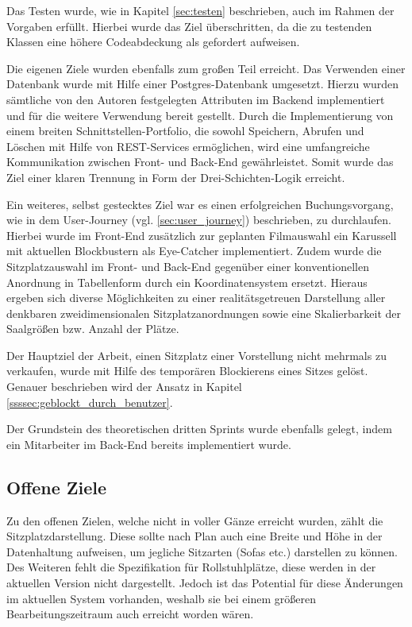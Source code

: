Das Testen wurde, wie in Kapitel \vref{sec:testen} beschrieben, auch im Rahmen der Vorgaben erfüllt. Hierbei wurde das Ziel überschritten, da die zu testenden Klassen eine höhere Codeabdeckung als gefordert aufweisen.

Die eigenen Ziele wurden ebenfalls zum großen Teil erreicht. Das Verwenden einer Datenbank wurde mit Hilfe einer Postgres-Datenbank umgesetzt.
Hierzu wurden sämtliche von den Autoren festgelegten Attributen im Backend implementiert und für die weitere Verwendung bereit gestellt.
Durch die Implementierung von einem breiten Schnittstellen-Portfolio, die sowohl Speichern, Abrufen und Löschen mit Hilfe von \acs{REST}-Services ermöglichen, wird eine umfangreiche Kommunikation zwischen Front- und Back-End gewährleistet.
Somit wurde das Ziel einer klaren Trennung in Form der Drei-Schichten-Logik erreicht.

Ein weiteres, selbst gestecktes Ziel war es einen erfolgreichen Buchungsvorgang, wie in dem User-Journey (vgl. \vref{sec:user_journey}) beschrieben, zu durchlaufen.
Hierbei wurde im Front-End zusätzlich zur geplanten Filmauswahl ein Karussell mit aktuellen Blockbustern als Eye-Catcher implementiert.
Zudem wurde die Sitzplatzauswahl im Front- und Back-End gegenüber einer konventionellen Anordnung in Tabellenform durch ein Koordinatensystem ersetzt.
Hieraus ergeben sich diverse Möglichkeiten zu einer realitätsgetreuen Darstellung aller denkbaren zweidimensionalen Sitzplatzanordnungen sowie eine Skalierbarkeit der Saalgrößen bzw. Anzahl der Plätze.

Der Hauptziel der Arbeit, einen Sitzplatz einer Vorstellung nicht mehrmals zu verkaufen, wurde mit Hilfe des temporären Blockierens eines Sitzes gelöst. 
Genauer beschrieben wird der Ansatz in Kapitel \vref{ssssec:geblockt_durch_benutzer}.

Der Grundstein des theoretischen dritten Sprints wurde ebenfalls gelegt, indem ein Mitarbeiter im Back-End bereits implementiert wurde.


\subsection{Offene Ziele}

Zu den offenen Zielen, welche nicht in voller Gänze erreicht wurden, zählt die Sitzplatzdarstellung.
Diese sollte nach Plan auch eine Breite und Höhe in der Datenhaltung aufweisen, um jegliche Sitzarten (Sofas etc.) darstellen zu können.
Des Weiteren fehlt die Spezifikation für Rollstuhlplätze, diese werden in der aktuellen Version nicht dargestellt.
Jedoch ist das Potential für diese Änderungen im aktuellen System vorhanden, weshalb sie bei einem größeren Bearbeitungszeitraum auch erreicht worden wären.

